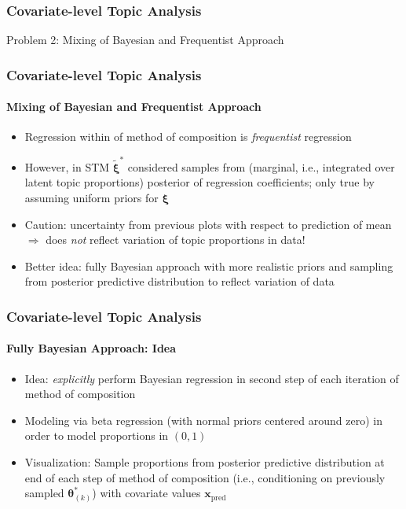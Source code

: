 \documentclass[xcolor=dvipsnames]{beamer}
\begin{document}
\begin{frame}
\frametitle{Covariate-level Topic Analysis}
\begin{center}
Problem 2: Mixing of Bayesian and Frequentist Approach
\end{center}
\end{frame}

\begin{frame}
\frametitle{Covariate-level Topic Analysis}
\framesubtitle{Mixing of Bayesian and Frequentist Approach}
\begin{itemize}
\item Regression within of method of composition is \textit{frequentist} regression
\item However, in STM $\tilde{\boldsymbol{\xi}}^*$ considered samples from (marginal, i.e., integrated over latent topic proportions) posterior of regression coefficients; only true by assuming uniform priors for $\boldsymbol{\xi}$
\item Caution: uncertainty from previous plots with respect to prediction of mean $\Rightarrow$ does \textit{not} reflect variation of topic proportions in data!
\item Better idea: fully Bayesian approach with more realistic priors and sampling from posterior predictive distribution to reflect variation of data
\end{itemize}
\end{frame}

\begin{frame}
\frametitle{Covariate-level Topic Analysis}
\framesubtitle{Fully Bayesian Approach: Idea}
\begin{itemize}
\item Idea: \textit{explicitly} perform Bayesian regression in second step of each iteration of method of composition
\item Modeling via beta regression (with normal priors centered around zero) in order to model proportions in $(0,1)$
\item Visualization: Sample proportions from posterior predictive distribution at end of each step of method of composition (i.e., conditioning on previously sampled $\boldsymbol{\theta}_{(k)}^*$) with covariate values $\boldsymbol{x}_{\text{pred}}$
\end{itemize}
\end{frame}
\end{document}
